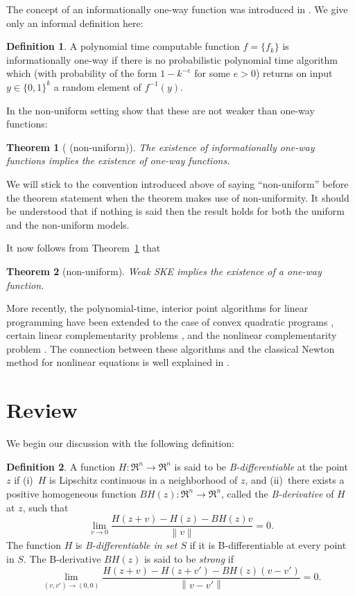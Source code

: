 \documentclass{article}
\newtheorem{thm}{Theorem}[section]
\theoremstyle{definition}
\newtheorem{defn}{Definition}[section]
\theoremstyle{remark}
\newcommand{\thmref}[1]{Theorem~\ref{#1}}
\newcommand{\enVert}[1]{\left\lVert#1\right\rVert}
\begin{document}
The concept of an informationally one-way function was introduced
in \cite{imlelu:oneway}. We give only an informal definition here:

\begin{defn} A polynomial time
computable function $f = \{f_k\}$ is informationally
one-way if there is no probabilistic polynomial time algorithm which
(with probability of the form $1 - k^{-e}$ for some $e > 0$)
returns on input $y \in \{0,1\}^{k}$ a random element of $f^{-1}(y)$.
\end{defn}
In the non-uniform setting \cite{imlelu:oneway} show that these are not
weaker than one-way functions:
\begin{thm}[\cite{imlelu:oneway} (non-uniform)]
\label{th-info-ow-ow}
The existence of informationally one-way functions
implies the existence of one-way functions.
\end{thm}
We will stick to the convention introduced above of saying
``non-uniform'' before the theorem statement when the theorem
makes use of non-uniformity. It should be understood that
if nothing is said then the result holds for both the uniform and
the non-uniform models.

It now follows from \thmref{th-info-ow-ow} that

\begin{thm}[non-uniform]\label{th-weak-ske-owf} Weak SKE
implies the existence of a one-way function.
\end{thm}

More recently, the polynomial-time, interior point algorithms for linear
programming have been extended to the case of convex quadratic programs
\cite{moad:quadpro,ye:intalg}, certain linear complementarity problems
\cite{komiyo:lincomp,miyoki:lincomp}, and the nonlinear complementarity
problem \cite{komiyo:unipfunc}. The connection between these algorithms
and the classical Newton method for nonlinear equations is well
explained in \cite{komiyo:lincomp}.

\section{Review}
\label{computation}

We begin our discussion with the following definition:

\begin{defn}

A function $H\colon \Re^n \to \Re^n$ is said to be
\emph{B-differentiable} at the point $z$ if (i)~$H$ is Lipschitz
continuous in a neighborhood of $z$, and (ii)~there exists a positive
homogeneous function $BH(z)\colon \Re^n \to \Re^n$, called the
\emph{B-derivative} of $H$ at $z$, such that
\[ \lim_{v \to 0} \frac{H(z+v) - H(z) - BH(z)v}{\enVert{v}} = 0. \]
The function $H$ is \textit{B-differentiable in set $S$} if it is
B-differentiable at every point in $S$. The B-derivative $BH(z)$ is said
to be \textit{strong} if
\[ \lim_{(v,v') \to (0,0)} \frac{H(z+v) - H(z+v') - BH(z)(v
 -v')}{\enVert{v - v'}} = 0. \]
\end{defn}
\end{document}
